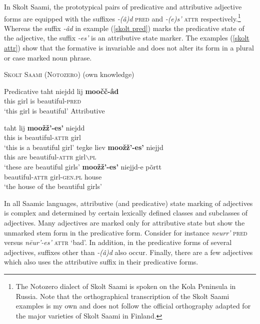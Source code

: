 In Skolt Saami, the prototypical pairs of predicative and attributive adjective forms are equipped with the suffixes \textit{-(â)d} \textsc{pred} and \textit{-(e)s'} \textsc{attr} respectively.\footnote{The Notozero dialect of Skolt Saami is spoken on the Kola Peninsula in Russia. Note that the orthographical transcription of the Skolt Saami examples is my own and does not follow the official orthography adapted for the major varieties of Skolt Saami in Finland.} Whereas the suffix \textit{-âd} in example (\ref{skolt pred}) marks the predicative state of the adjective, the suffix \textit{-es'} is an attributive state marker. The examples (\ref{skolt attr}) show that the formative is invariable and does not alter its form in a plural or case marked noun phrase.
\begin{exe}
\ex \textsc{Skolt Saami (Notozero)} (own knowledge)
\begin{xlist}
\ex	Predicative \label{skolt pred}
\gll	taht niejdd lij \textbf{moočč-âd}\\
	this girl is beautiful-\textsc{pred}\\
\glt	‘this girl is beautiful’
\ex	Attributive \label{skolt attr}
\begin{xlist}
\ex
\gll 	taht lij \textbf{moožž'-es'} niejdd\\
	this is beautiful-\textsc{attr} girl\\
\glt	‘this is a beautiful girl’
\ex	
\gll	tegke liev \textbf{moožž'-es'} niejjd\\
	this are beautiful-\textsc{attr} girl$\backslash$\textsc{pl}\\
\glt	‘these are beautiful girls’
\ex	
\gll	\textbf{moožž'-es'} niejjd-e põrtt\\
	beautiful-\textsc{attr} girl-\textsc{gen.pl} house\\
\glt	‘the house of the beautiful girls’
\end{xlist}
\end{xlist}
\end{exe}
In all Saamic languages, attributive (and predicative) state marking of adjectives is complex and determined by certain lexically defined classes and subclasses of adjectives. Many adjectives are marked only for attributive state but show the unmarked stem form in the predicative form. Consider for instance \textit{neurr'} \textsc{pred} versus \textit{nēur'-es'} \textsc{attr} ‘bad’. In addition, in the predicative forms of several adjectives, suffixes other than \textit{-(â)d} also occur. Finally, there are a few adjectives which also uses the attributive suffix in their predicative forms.

